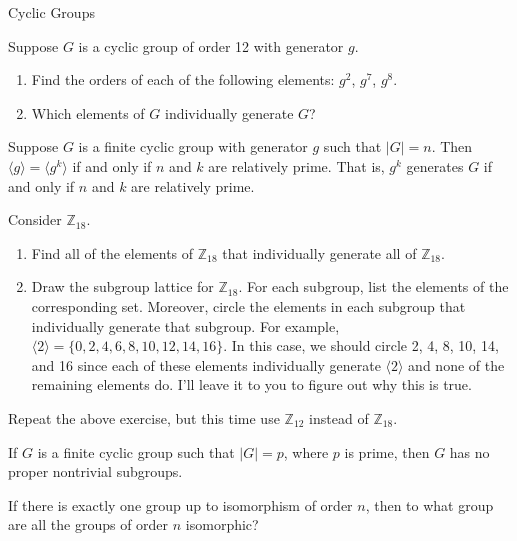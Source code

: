 \begin{section}{Cyclic Groups}
\begin{problem}
Suppose $G$ is a cyclic group of order 12 with generator $g$. 
\begin{enumerate}[label=\rm{(\alph*)}]
\item Find the orders of each of the following elements: $g^2$, $g^7$, $g^8$.
\item Which elements of $G$ individually generate $G$?
\end{enumerate}
\end{problem}

\begin{corollary}
Suppose $G$ is a finite cyclic group with generator $g$ such that $|G|=n$. Then $\langle g\rangle=\langle g^k\rangle$ if and only if $n$ and $k$ are relatively prime. That is, $g^k$ generates $G$ if and only if $n$ and $k$ are relatively prime.
\end{corollary}

\begin{problem}
Consider $\mathbb{Z}_{18}$.
\begin{enumerate}[label=\rm{(\alph*)}]
\item Find all of the elements of $\mathbb{Z}_{18}$ that individually generate all of $\mathbb{Z}_{18}$.
\item Draw the subgroup lattice for $\mathbb{Z}_{18}$. For each subgroup, list the elements of the corresponding set.  Moreover, circle the elements in each subgroup that individually generate that subgroup.  For example, $\langle 2\rangle=\{0,2,4,6,8,10,12,14,16\}$. In this case, we should circle 2, 4, 8, 10, 14, and 16 since each of these elements individually generate $\langle 2\rangle$ and none of the remaining elements do.  I'll leave it to you to figure out why this is true.
\end{enumerate}
\end{problem}

\begin{problem}
Repeat the above exercise, but this time use $\mathbb{Z}_{12}$ instead of $\mathbb{Z}_{18}$.
\end{problem}

\begin{corollary}
If $G$ is a finite cyclic group such that $|G|=p$, where $p$ is prime, then $G$ has no proper nontrivial subgroups.
\end{corollary}

\begin{problem}
If there is exactly one group up to isomorphism of order $n$, then to what group are all the groups of order $n$ isomorphic?
\end{problem}


\end{section}

